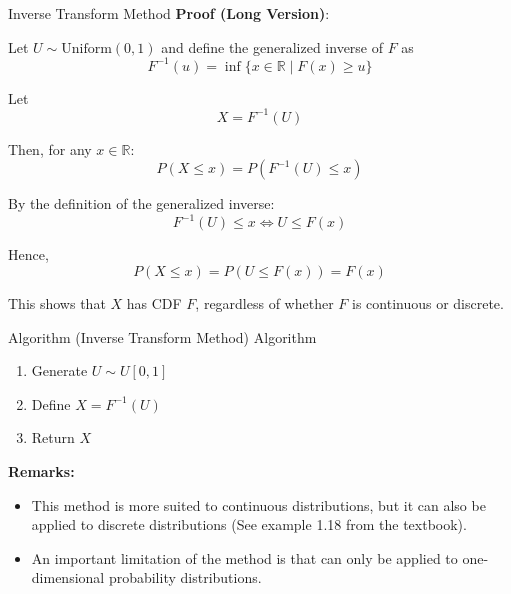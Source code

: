 \documentclass[8pt]{beamer}
\begin{document}
\begin{frame}{Inverse Transform Method}
\textbf{Proof (Long Version)}: 

Let $U \sim \text{Uniform}(0,1)$ and define the generalized inverse of $F$ as
\begin{equation*}
F^{-1}(u) = \inf \{ x \in \mathbb{R} \mid F(x) \ge u \}
\end{equation*}

Let
\begin{equation*}
X = F^{-1}(U)
\end{equation*}

Then, for any $x \in \mathbb{R}$:
\begin{equation*}
P(X \le x) = P(F^{-1}(U) \le x)
\end{equation*}

By the definition of the generalized inverse:
\begin{equation*}
F^{-1}(U) \le x \iff U \le F(x)
\end{equation*}

Hence,
\begin{equation*}
P(X \le x) = P(U \le F(x)) = F(x)
\end{equation*}

This shows that $X$ has CDF $F$, regardless of whether $F$ is continuous or discrete.
\end{frame}

\begin{frame}{Algorithm (Inverse Transform Method)}
\alert{Algorithm}
\begin{enumerate}
\item Generate $U \sim U[0,1]$ 
\item Define $X=F^{-1}(U)$
\item Return $X$

\end{enumerate}
\pause

{\bf Remarks:} 

\begin{itemize}

\item This method is more suited to continuous distributions, but it can also be applied to discrete distributions (See example 1.18 from the textbook).

\item An important limitation of the method is that can only be applied to one-dimensional probability distributions.

\end{itemize}
\end{frame}
\end{document}
